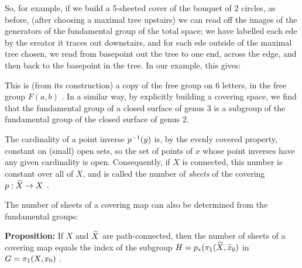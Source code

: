 \msk

So, for example, if we build a 5-sheeted cover of the bouquet of 2 circles, 
as before, (after choosing a maximal tree upstairs) 
we can read off the images of the generators of the fundamental group
of the total space; we have labelled each ede by the ereator it
traces out downstairs, and for each ede outside of the maximal tree
chosen, we read from basepoint out the tree to one end, across the edge,
and then back to the basepoint in the tree. In our example, this
gives:


\msk


\msk

\leavevmode


\epsfxsize=3in


\bsk

This is (from its construction) a copy of the free group on 6 letters,
in the free group $F(a,b)$ . In a similar way, by explicitly building
a covering space, we find that the fundamental group of a closed 
surface of genus 3 is a subgroup of the fundamental group of the 
closed surface of genus 2. 

\msk

The cardinality of a point inverse $p^{-1}(y)$ is, by the evenly
covered property, constant on (small) open sets, so the set of 
points of $x$ whose point inverses have any given cardinality
is open. Consequently, if $X$ is connected, this number
is constant over all of $X$, and is called the number of {\it sheets}
of the covering $p:\widetilde{X}\rightarrow X$ . 

\bsk


The number of sheets of a covering map can also be determined 
from the fundamental groups:

\msk

{\bf Proposition:} If $X$ and $\widetilde{X}$ are 
path-connected, then the number of sheets of a covering map equals
the index of the subgroup $H=p_*(\pi_1(\widetilde{X},\widetilde{x}_0)$ in 
$G=\pi_1(X,x_0)$ . 

\msk

